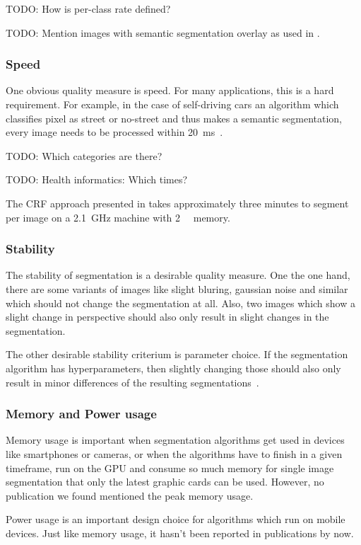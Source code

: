 TODO: How is per-class rate defined?

TODO: Mention images with semantic segmentation overlay as used in \cite{gould2009decomposing}.

\subsubsection{Speed}%
\label{subsubsec:speed-quality-measure}%
One obvious quality measure is speed. For many applications, this is a hard
requirement. For example, in the case of self-driving cars an algorithm which
classifies pixel as street or no-street and thus makes a semantic segmentation,
every image needs to be processed within
\SI{20}{\milli\second}~\cite{bittel2015pixel}.

TODO: Which categories are there?

TODO: Health informatics: Which times?

The \gls{CRF} approach presented in \cite{shotton2006textonboost} takes
approximately three minutes to segment per image on a \SI{2.1}{\giga\hertz}
machine with \SI{2}{\giga\byte} memory.


\subsubsection{Stability}%
\label{subsubsec:stability-quality-measure}%
The stability of segmentation is a desirable quality measure. One the one hand,
there are some variants of images like slight bluring, gaussian noise and
similar which should not change the segmentation at all. Also, two images which
show a slight change in perspective should also only result in slight changes
in the segmentation.\cite{pantofaru2005comparison}

The other desirable stability criterium is parameter choice. If the
segmentation algorithm has hyperparameters, then slightly changing those should
also only result in minor differences of the resulting segmentations~\cite{pantofaru2005comparison}.


\subsubsection{Memory and Power usage}
Memory usage is important when segmentation algorithms get used in devices like
smartphones or cameras, or when the algorithms have to finish in a given
timeframe, run on the \gls{GPU} and consume so much memory for single image
segmentation that only the latest graphic cards can be used. However, no
publication we found mentioned the peak memory usage.

Power usage is an important design choice for algorithms which run on mobile
devices. Just like memory usage, it hasn't been reported in publications by
now.
